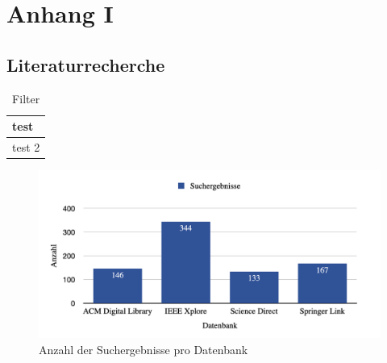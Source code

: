 \appendix

\chapter{Anhang I}

\section{Literaturrecherche}
\label{sec:appendix_search_filter}

\begin{table}
    \centering
    \begin{tabular}{l}
        \hline
        test \\
        \toprule
        test 2 \\
        \toprule
    \end{tabular}
    \caption{Filter}
\end{table}

\begin{figure}[htb]
    \centering
    \includegraphics[width=0.75\linewidth]{contents/04_literature_review/res/database_results.png}
    \caption{Anzahl der Suchergebnisse pro Datenbank}
    \label{fig:04_literature_review_screening_process}
\end{figure}

